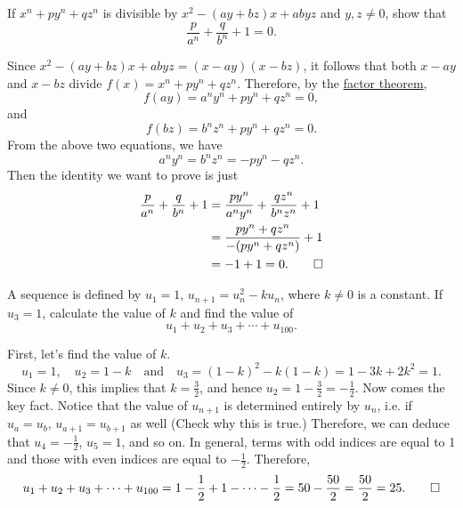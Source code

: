 \begin{question}
    If $x^{n} + py^{n} + qz^{n}$ is divisible by $x^2 - (ay + bz)x + abyz$ and
    $y, z \ne 0$, show that 
    \[\frac{p}{a^n} + \frac{q}{b^n} + 1 = 0.\] 
\end{question}
\begin{solution}
    Since $x^2 - (ay + bz)x + abyz = (x - ay)(x - bz)$, it follows that both $x
    - ay$ and $x - bz$ divide $f(x) = x^n + py^n + qz^n$. Therefore, by the
    \hyperref[thm: remainder]{factor theorem},
    \[ f(ay) = a^ny^n + py^n + qz^n = 0, \] 
    and 
    \[ f(bz) = b^nz^n + py^n + qz^n = 0.\]
    From the above two equations, we have
    \[ a^ny^n = b^nz^n = -py^n - qz^n.\]
    Then the identity we want to prove is just
    \begin{align*}
        \frac{p}{a^n} + \frac{q}{b^n} + 1 &= \frac{py^n}{a^ny^n} + \frac{qz^n}{b^nz^n} + 1\\
        &= \frac{py^n + qz^n}{-(py^n + qz^n)} + 1\\
        &= -1 + 1 = 0. \qedhere
    \end{align*}
\end{solution}

\begin{question}
    A sequence is defined by $u_{1} = 1$, $u_{n + 1} = u_{n}^2 - ku_{n}$, where
    $k \ne 0$ is a constant. If $u_{3} = 1$, calculate the value of $k$ and
    find the value of
    \[u_{1} + u_{2} + u_{3} + \cdots + u_{100}.\]
\end{question}
\begin{solution}
    First, let's find the value of $k$.
    \[ u_1 = 1, \quad u_2 = 1 - k \quad\text{and}\quad u_3 = (1 - k)^2 - k(1 - k) = 1 - 3k + 2k^2 = 1. \]
    Since $k \ne 0$, this implies that $k = \frac{3}{2}$, and hence $u_2 = 1 -
    \frac{3}{2} = -\frac{1}{2}$. Now comes the key fact. Notice that the value
    of $u_{n + 1}$ is determined entirely by $u_n$, i.e. if $u_a = u_b$, $u_{a
    + 1} = u_{b + 1}$ as well (Check why this is true.) Therefore, we can
    deduce that $u_4 = -\frac{1}{2}$, $u_5 = 1$, and so on. In general, terms
    with odd indices are equal to 1 and those with even indices are equal to
    $-\frac{1}{2}$. Therefore,
    \[ u_1 + u_2 + u_3 + \cdots + u_{100} = 1 - \frac{1}{2} + 1 - \cdots -
    \frac{1}{2} = 50 - \frac{50}{2} = \frac{50}{2} = 25. \qedhere \]
\end{solution}

